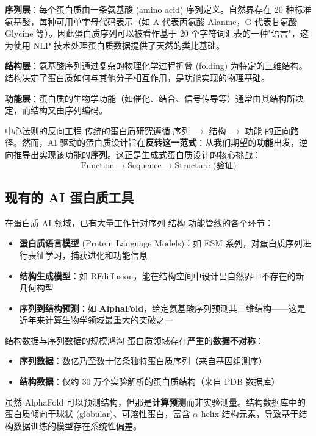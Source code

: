 \documentclass[a4paper]{article}
\begin{document}
\textbf{序列层}：每个蛋白质由一条氨基酸 (amino acid) 序列定义。自然界存在 20 种标准氨基酸，每种可用单字母代码表示（如 A 代表丙氨酸 Alanine，G 代表甘氨酸 Glycine 等）。因此蛋白质序列可以被看作基于 20 个字符词汇表的一种"语言"，这为使用 NLP 技术处理蛋白质数据提供了天然的类比基础。

\textbf{结构层}：氨基酸序列通过复杂的物理化学过程折叠 (folding) 为特定的三维结构。结构决定了蛋白质如何与其他分子相互作用，是功能实现的物理基础。

\textbf{功能层}：蛋白质的生物学功能（如催化、结合、信号传导等）通常由其结构所决定，而结构又由序列编码。

\begin{importantbox}{中心法则的反向工程}
传统的蛋白质研究遵循 序列 $\rightarrow$ 结构 $\rightarrow$ 功能 的正向路径。然而，AI 驱动的蛋白质设计旨在\textbf{反转这一范式}：从我们期望的\textbf{功能}出发，逆向推导出实现该功能的\textbf{序列}。这正是生成式蛋白质设计的核心挑战：
$$\text{Function} \rightarrow \text{Sequence} \rightarrow \text{Structure (验证)}$$
\end{importantbox}

\subsection{现有的 AI 蛋白质工具}

在蛋白质 AI 领域，已有大量工作针对序列-结构-功能管线的各个环节：

\begin{itemize}
    \item \textbf{蛋白质语言模型} (Protein Language Models)：如 ESM 系列，对蛋白质序列进行表征学习，捕获进化和功能信息
    \item \textbf{结构生成模型}：如 RFdiffusion，能在结构空间中设计出自然界中不存在的新几何构型
    \item \textbf{序列到结构预测}：如 \textbf{AlphaFold}，给定氨基酸序列预测其三维结构——这是近年来计算生物学领域最重大的突破之一
\end{itemize}

\begin{warningbox}{结构数据与序列数据的规模鸿沟}
蛋白质领域存在严重的\textbf{数据不对称}：
\begin{itemize}
    \item \textbf{序列数据}：数亿乃至数十亿条独特蛋白质序列（来自基因组测序）
    \item \textbf{结构数据}：仅约 30 万个实验解析的蛋白质结构（来自 PDB 数据库）
\end{itemize}
虽然 AlphaFold 可以预测结构，但那是\textbf{计算预测}而非实验测量。结构数据库中的蛋白质倾向于球状 (globular)、可溶性蛋白，富含 $\alpha$-helix 结构元素，导致基于结构数据训练的模型存在系统性偏差。
\end{warningbox}
\end{document}
